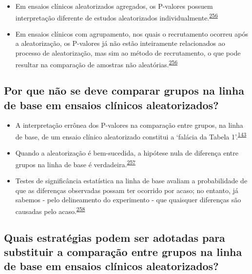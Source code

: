 \documentclass[
  a4paper,
]{book}
\begin{document}
\begin{itemize}
\item
  Em ensaios clínicos aleatorizados agregados, os P-valores possuem interpretação diferente de estudos aleatorizados individualmente.\textsuperscript{\protect\hyperlink{ref-Bolzern2019}{256}}
\item
  Em ensaios clínicos com agrupamento, nos quais o recrutamento ocorreu após a aleatorização, os P-valores já não estão inteiramente relacionados ao processo de aleatorização, mas sim ao método de recrutamento, o que pode resultar na comparação de amostras não aleatórias.\textsuperscript{\protect\hyperlink{ref-Bolzern2019}{256}}
\end{itemize}

\hypertarget{por-que-nuxe3o-se-deve-comparar-grupos-na-linha-de-base-em-ensaios-cluxednicos-aleatorizados}{%
\subsection{Por que não se deve comparar grupos na linha de base em ensaios clínicos aleatorizados?}\label{por-que-nuxe3o-se-deve-comparar-grupos-na-linha-de-base-em-ensaios-cluxednicos-aleatorizados}}

\begin{itemize}
\item
  A interpretação errônea dos P-valores na comparação entre grupos, na linha de base, de um ensaio clínico aleatorizado constitui a `falácia da Tabela 1'.\textsuperscript{\protect\hyperlink{ref-pijls2022}{143}}
\item
  Quando a aleatorização é bem-sucedida, a hipótese nula de diferença entre grupos na linha de base é verdadeira.\textsuperscript{\protect\hyperlink{ref-roberts1999}{257}}
\item
  Testes de significância estatística na linha de base avaliam a probabilidade de que as diferenças observadas possam ter ocorrido por acaso; no entanto, já sabemos - pelo delineamento do experimento - que quaisquer diferenças são causadas pelo acaso.\textsuperscript{\protect\hyperlink{ref-gruijters2020}{258}}
\end{itemize}

\hypertarget{quais-estratuxe9gias-podem-ser-adotadas-para-substituir-a-comparauxe7uxe3o-entre-grupos-na-linha-de-base-em-ensaios-cluxednicos-aleatorizados}{%
\subsection{Quais estratégias podem ser adotadas para substituir a comparação entre grupos na linha de base em ensaios clínicos aleatorizados?}\label{quais-estratuxe9gias-podem-ser-adotadas-para-substituir-a-comparauxe7uxe3o-entre-grupos-na-linha-de-base-em-ensaios-cluxednicos-aleatorizados}}
\end{document}
